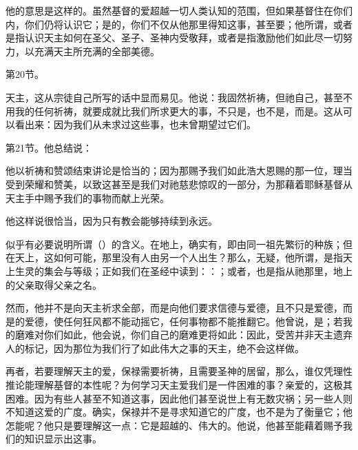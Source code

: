 他的意思是这样的。虽然基督的爱超越一切人类认知的范围，但如果基督住在你们内，你们仍将认识它；是的，你们不仅从他那里得知这事，甚至要；他所谓，或者是指认识天主如何在圣父、圣子、圣神内受敬拜，或者是指激励他们如此尽一切努力，以充满天主所充满的全部美德。\par

第20节。\par

天主，这从宗徒自己所写的话中显而易见。他说：我固然祈祷，但祂自己，甚至不用我的任何祈祷，就要成就比我们所求更大的事，不只是，也不是，而是。这从可以看出来：因为我们从未求过这些事，也未曾期望过它们。\par

第21节。他总结说：\par

他以祈祷和赞颂结束讲论是恰当的；因为那赐予我们如此浩大恩赐的那一位，理当受到荣耀和赞美，以致这甚至是我们对祂慈悲惊叹的一部分，为那藉着耶稣基督从天主手中赐予我们的事物而献上光荣。\par

他这样说很恰当，因为只有教会能够持续到永远。\par

似乎有必要说明所谓（）的含义。在地上，确实有，即由同一祖先繁衍的种族；但在天上，这如何可能，那里没有人由另一个人出生？那么，无疑，他所谓，是指天上生灵的集会与等级；正如我们在圣经中读到：：；或者，也是指从祂那里，地上的父亲取得父亲之名。\par

然而，他并不是向天主祈求全部，而是向他们要求信德与爱德，且不只是爱德，而是的爱德，使任何狂风都不能动摇它，任何事物都不能推翻它。他曾说，是；若我的磨难对你们如此，他会说，你们自己的磨难更将如此：因此，受苦并非天主遗弃人的标记，因为那位为我们行了如此伟大之事的天主，绝不会这样做。\par

再者，若要理解天主的爱，保禄需要祈祷，且需要圣神的居留，那么，谁仅凭理性推论能理解基督的本性呢？为何学习天主爱我们是一件困难的事？亲爱的，这极其困难。因为有些人甚至不知道这事，因此他们甚至说世上有无数灾祸；另一些人则不知道这爱的广度。确实，保禄并不是寻求知道它的广度，也不是为了衡量它；他怎能呢？他只是要理解这一点：它是超越的、伟大的。他说，他甚至能藉着赐予我们的知识显示出这事。\par

